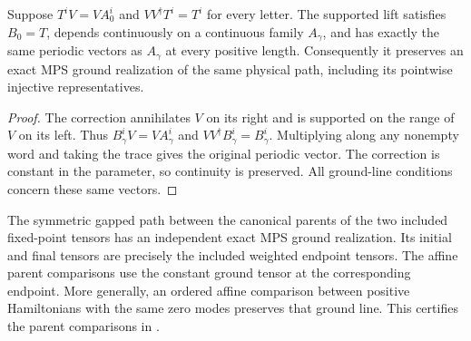 \begin{lemma}
    \label{thm:spt_supported_bond_lift}
    \leanok
    Suppose $T^iV=VA_0^i$ and $VV^\dagger T^i=T^i$ for every letter.
    The supported lift satisfies $B_0=T$, depends continuously on a
    continuous family $A_\gamma$, and has exactly the same periodic
    vectors as $A_\gamma$ at every positive length. Consequently it
    preserves an exact MPS ground realization of the same physical path,
    including its pointwise injective representatives.
\end{lemma}

\begin{proof}\leanok
    The correction annihilates $V$ on its right and is supported on
    the range of $V$ on its left. Thus $B_\gamma^iV=VA_\gamma^i$
    and $VV^\dagger B_\gamma^i=B_\gamma^i$. Multiplying along any
    nonempty word and taking the trace gives the original periodic
    vector. The correction is constant in the parameter, so continuity
    is preserved. All ground-line conditions concern these same vectors.
\end{proof}

\begin{lemma}
    \label{thm:spt_common_physical_canonical_ground_path}
    \leanok

    The symmetric gapped path between the canonical parents of the two
    included fixed-point tensors has an independent exact MPS ground
    realization. Its initial and final tensors are precisely the included
    weighted endpoint tensors. The affine parent comparisons use the
    constant ground tensor at the corresponding endpoint.
    More generally, an ordered affine comparison between positive
    Hamiltonians with the same zero modes preserves that ground line.
    This certifies the parent comparisons in
    \cite[Section~II.F.2]{Schuch2011Phases}.
\end{lemma}

